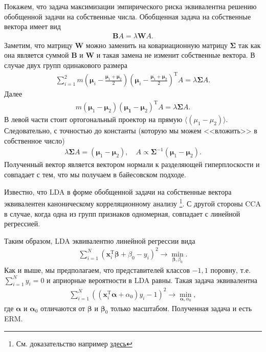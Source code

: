 \documentclass{article}
\begin{document}
Покажем, что задача максимизации эмпирического риска эквивалентна решению обобщенной задачи на собственные числа. Обобщенная задача на собственные вектора имеет вид
\begin{align*}
    \mathbf{B}A = \lambda\mathbf{W}A.
\end{align*}
Заметим, что матрицу $\mathbf{W}$ можно заменить на ковариационную матрицу $\mathbf{\Sigma}$ так как она является суммой $\mathbf{B}$ и  $\mathbf{W}$ и такая замена не изменит собственные вектора. В случае двух групп одинакового размера
\begin{align*}
\sum_{i = 1}^2 m (\mathbf{\mu}_i - \frac{\mathbf{\mu}_1 + \mathbf{\mu}_2}{2})(\mathbf{\mu}_i - \frac{\mathbf{\mu}_1 + \mathbf{\mu}_2}{2})^\mathrm{T}A = \lambda \mathbf{\Sigma}A.
\end{align*}
Далее
\begin{align*}
 m(\mathbf{\mu}_1 - \mathbf{\mu}_2)(\mathbf{\mu_1} - \mathbf{\mu}_2)^\mathrm{T}A = \lambda \mathbf{\Sigma}A.
\end{align*}
В левой части стоит ортогональный проектор на прямую $\langle (\mu_1 - \mu_2) \rangle$. Следовательно, с точностью до константы (которую мы можем <<вложить>> в собственное число)
\begin{align*}
  \lambda\mathbf{\Sigma}A = (\mathbf{\mu}_1 - \mathbf{\mu}_2), \quad A \propto \mathbf{\Sigma}^{-1}(\mathbf{\mu}_1 - \mathbf{\mu}_2).
\end{align*}
Полученный вектор является вектором нормали к разделяющей гиперплоскости и совпадает с тем, что мы получаем в байесовском подходе.

Известно, что LDA в форме обобщенной задачи на собственные вектора эквивалентен каноническому корреляционному анализу \footnote{См. доказательство например \href{https://www.stat.washington.edu/wxs/Stat592-w2011/Slides/cancorr-notes.pdf}{здесь}}. С другой стороны CCA в случае, когда одна из групп признаков одномерная, совпадает с линейной регрессией.

Таким образом, LDA эквивалентно линейной регрессии вида
\begin{align*}
  \sum_{i = 1}^N\left(\mathbf{x}^\mathrm{T}_i\mathbf{\beta} + \beta_0-y_i\right)^2 \rightarrow \min\limits_{\mathbf{\beta},\beta_0}.
\end{align*}
Как и выше, мы предполагаем, что представителей классов ${-1, 1}$ поровну, т.е. $\sum_{i = 1}^N y_i = 0$ и априорные вероятности в LDA равны. Такая задача эквивалентна
\begin{align*}
  \sum_{i = 1}^N\left((\mathbf{x}^\mathrm{T}_i\mathbf{\alpha} + \alpha_0)y_i - 1\right)^2 \rightarrow \min\limits_{\mathbf{\alpha},\alpha_0},
\end{align*}
где $\mathbf{\alpha}$ и $\mathbf{\alpha}_0$ отличаются от $\mathbf{\beta}$ и $\mathbf{\beta}_0$ только масштабом. Полученная задача и есть ERM.
\end{document}
